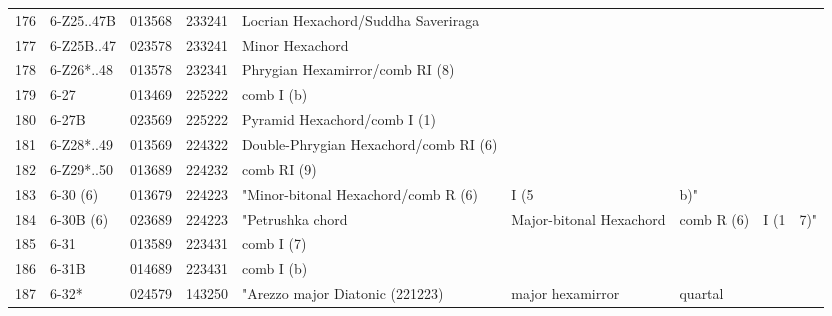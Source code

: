 \begin{table}[h]
\begin{tabular}{lllll}
176                    & 6-Z25..47B          & 013568  & 233241    & Locrian Hexachord/Suddha Saveriraga                        &                             &                   &      &     \\
177                    & 6-Z25B..47          & 023578  & 233241    & Minor Hexachord                                            &                             &                   &      &     \\
178                    & 6-Z26*..48          & 013578  & 232341    & Phrygian Hexamirror/comb RI (8)                            &                             &                   &      &     \\
179                    & 6-27                & 013469  & 225222    & comb I (b)                                                 &                             &                   &      &     \\
180                    & 6-27B               & 023569  & 225222    & Pyramid Hexachord/comb I (1)                               &                             &                   &      &     \\
181                    & 6-Z28*..49          & 013569  & 224322    & Double-Phrygian Hexachord/comb RI (6)                      &                             &                   &      &     \\
182                    & 6-Z29*..50          & 013689  & 224232    & comb RI (9)                                                &                             &                   &      &     \\
183                    & 6-30 (6)            & 013679  & 224223    & "Minor-bitonal Hexachord/comb R (6)                        & I (5                        & b)"               &      &     \\
184                    & 6-30B (6)           & 023689  & 224223    & "Petrushka chord                                           & Major-bitonal Hexachord     & comb R (6)        & I (1 & 7)" \\
185                    & 6-31                & 013589  & 223431    & comb I (7)                                                 &                             &                   &      &     \\
186                    & 6-31B               & 014689  & 223431    & comb I (b)                                                 &                             &                   &      &     \\
187                    & 6-32*               & 024579  & 143250    & "Arezzo major Diatonic (221223)                            & major hexamirror            & quartal           &      &     \\

\end{tabular}
\end{table}
